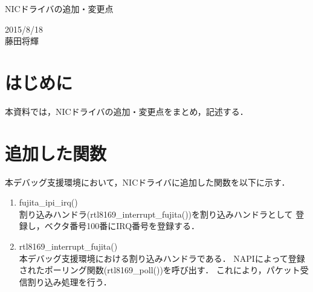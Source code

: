 \documentclass[12pt]{jsarticle}
\begin{document}

\begin{center}
    {\LARGE NICドライバの追加・変更点}
\end{center}

\begin{flushright}
  2015/8/18\\
  藤田将輝
\end{flushright}
\section{はじめに}
本資料では，NICドライバの追加・変更点をまとめ，記述する．
\section{追加した関数}
本デバッグ支援環境において，NICドライバに追加した関数を以下に示す．
\begin{enumerate}
    \item fujita\_ipi\_irq()\\
        割り込みハンドラ(rtl8169\_interrupt\_fujita())を割り込みハンドラとして
        登録し，ベクタ番号100番にIRQ番号を登録する．
    \item rtl8169\_interrupt\_fujita()\\
        本デバッグ支援環境における割り込みハンドラである．
        NAPIによって登録されたポーリング関数(rtl8169\_poll())を呼び出す．
        これにより，パケット受信割り込み処理を行う．
\end{enumerate}
\end{document}
